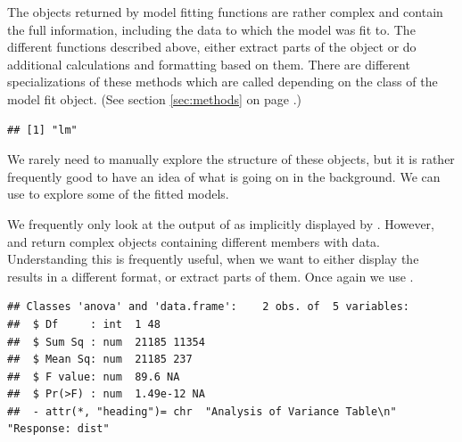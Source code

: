 \documentclass[krantz2]{krantz}\usepackage{knitr}%
\begin{document}
\begin{explainbox}
The objects returned by model fitting functions are rather complex and contain the full information, including the data to which the model was fit to. The different functions described above, either extract parts of the object or do additional calculations and formatting based on them. There are different specializations of these methods which are called depending on the class of the model fit object. (See section \ref{sec:methods} on page \pageref{sec:methods}.)

\begin{knitrout}\footnotesize
{}\color{fgcolor}\begin{kframe}
\begin{alltt}
\end{alltt}
\begin{verbatim}
## [1] "lm"
\end{verbatim}
\end{kframe}
\end{knitrout}

We rarely need to manually explore the structure of these objects, but it is rather frequently good to have an idea of what is going on in the background. We can use  to explore some of the fitted models.

\begin{knitrout}\footnotesize
{}\color{fgcolor}\begin{kframe}
\begin{alltt}
  \hlstd{=} \hlstd{)} 
\end{alltt}
\end{kframe}
\end{knitrout}

We frequently only look at the output of  as implicitly displayed by . However,  and  return complex objects containing different members with data. Understanding this is frequently useful, when we want to either display the results in a different format, or extract parts of them. Once again we use .

\begin{knitrout}\footnotesize
{}\color{fgcolor}\begin{kframe}
\begin{alltt}
\hlstd{(}
\end{alltt}
\begin{verbatim}
## Classes 'anova' and 'data.frame':	2 obs. of  5 variables:
##  $ Df     : int  1 48
##  $ Sum Sq : num  21185 11354
##  $ Mean Sq: num  21185 237
##  $ F value: num  89.6 NA
##  $ Pr(>F) : num  1.49e-12 NA
##  - attr(*, "heading")= chr  "Analysis of Variance Table\n" "Response: dist"
\end{verbatim}
\end{kframe}
\end{knitrout}


\end{explainbox}
\end{document}
